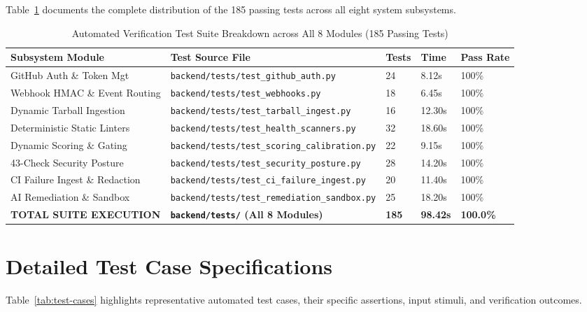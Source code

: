 \documentclass[12pt,a4paper,oneside]{report}
\begin{document}
Table~\ref{tab:test-breakdown} documents the complete distribution of the 185 passing tests across all eight system subsystems.

\begin{table}[htbp]
    \centering
    \caption{Automated Verification Test Suite Breakdown across All 8 Modules (185 Passing Tests)}
    \label{tab:test-breakdown}
    \small
    \begin{tabularx}{\textwidth}{p{} p{} p{} p{} p{}}
        \toprule
        \textbf{Subsystem Module} & \textbf{Test Source File} & \textbf{Tests} & \textbf{Time} & \textbf{Pass Rate} \\
        \midrule
        GitHub Auth \& Token Mgt & \texttt{backend/tests/test\_github\_auth.py} & 24 & 8.12s & 100\% \\
        Webhook HMAC \& Event Routing & \texttt{backend/tests/test\_webhooks.py} & 18 & 6.45s & 100\% \\
        Dynamic Tarball Ingestion & \texttt{backend/tests/test\_tarball\_ingest.py} & 16 & 12.30s & 100\% \\
        Deterministic Static Linters & \texttt{backend/tests/test\_health\_scanners.py} & 32 & 18.60s & 100\% \\
        Dynamic Scoring \& Gating & \texttt{backend/tests/test\_scoring\_calibration.py} & 22 & 9.15s & 100\% \\
        43-Check Security Posture & \texttt{backend/tests/test\_security\_posture.py} & 28 & 14.20s & 100\% \\
        CI Failure Ingest \& Redaction & \texttt{backend/tests/test\_ci\_failure\_ingest.py} & 20 & 11.40s & 100\% \\
        AI Remediation \& Sandbox & \texttt{backend/tests/test\_remediation\_sandbox.py} & 25 & 18.20s & 100\% \\
        \midrule
        \textbf{TOTAL SUITE EXECUTION} & \textbf{\texttt{backend/tests/} (All 8 Modules)} & \textbf{185} & \textbf{98.42s} & \textbf{100.0\%} \\
        \bottomrule
    \end{tabularx}
\end{table}

\section{Detailed Test Case Specifications}
\label{sec:test-cases}

Table~\ref{tab:test-cases} highlights representative automated test cases, their specific assertions, input stimuli, and verification outcomes.
\end{document}
